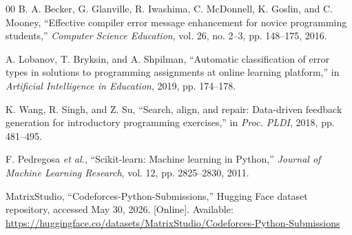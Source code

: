 \documentclass[conference]{IEEEtran}
\begin{document}
\begin{thebibliography}{00}
B. A. Becker, G. Glanville, R. Iwashima, C. McDonnell, K. Goslin, and C. Mooney, ``Effective compiler error message enhancement for novice programming students,'' \emph{Computer Science Education}, vol. 26, no. 2--3, pp. 148--175, 2016.

A. Lobanov, T. Bryksin, and A. Shpilman, ``Automatic classification of error types in solutions to programming assignments at online learning platform,'' in \emph{Artificial Intelligence in Education}, 2019, pp. 174--178.

K. Wang, R. Singh, and Z. Su, ``Search, align, and repair: Data-driven feedback generation for introductory programming exercises,'' in \emph{Proc. PLDI}, 2018, pp. 481--495.

F. Pedregosa \emph{et al.}, ``Scikit-learn: Machine learning in Python,'' \emph{Journal of Machine Learning Research}, vol. 12, pp. 2825--2830, 2011.

MatrixStudio, ``Codeforces-Python-Submissions,'' Hugging Face dataset repository, accessed May 30, 2026. [Online]. Available: \url{https://huggingface.co/datasets/MatrixStudio/Codeforces-Python-Submissions}

\end{thebibliography}
\end{document}
